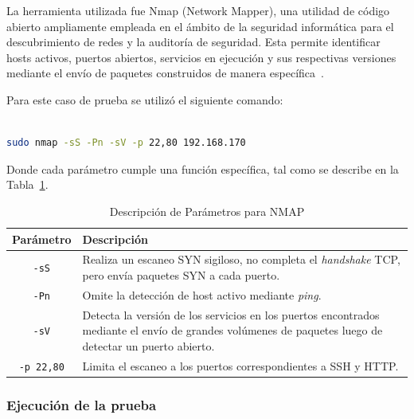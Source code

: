 La herramienta utilizada fue Nmap (Network Mapper), una utilidad de código abierto ampliamente empleada en el ámbito de la seguridad 
informática para el descubrimiento de redes y la auditoría de seguridad. Esta permite identificar hosts activos, puertos abiertos, 
servicios en ejecución y sus respectivas versiones mediante el envío de paquetes construidos de manera específica~\cite{Nmap2026}.

Para este caso de prueba se utilizó el siguiente comando:

\begin{lstlisting}[language=bash, caption={Comando Nmap utilizado para el escaneo de reconocimiento}, label={lst:nmap_scan}]

sudo nmap -sS -Pn -sV -p 22,80 192.168.170

\end{lstlisting}

Donde cada parámetro cumple una función específica, tal como se describe en la Tabla~\ref{tab:parametros_nmap}.

\begin{table}[H]
\centering
\caption{Descripción de Parámetros para NMAP}\label{tab:parametros_nmap}
\begin{tabular}{|c|p{9cm}|}
\hline
\textbf{Parámetro} & \textbf{Descripción} \\ \hline

\texttt{-sS} & Realiza un escaneo SYN sigiloso, no completa el \textit{handshake} TCP, pero envía paquetes SYN a cada puerto. \\ \hline

\texttt{-Pn} & Omite la detección de host activo mediante \textit{ping}. \\ \hline

\texttt{-sV} & Detecta la versión de los servicios en los puertos encontrados mediante el envío de grandes volúmenes de paquetes luego de detectar un puerto abierto. \\ \hline

\texttt{-p 22,80} & Limita el escaneo a los puertos correspondientes a SSH y HTTP. \\ \hline

\end{tabular}
\end{table}

\subsubsection{Ejecución de la prueba}
\noindent

